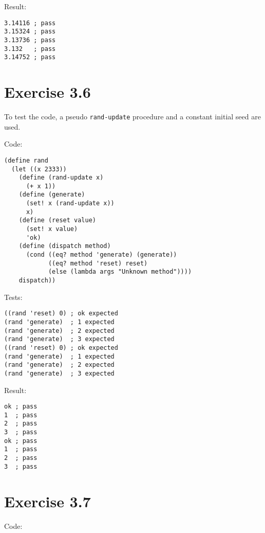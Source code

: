 \documentclass[../main.tex]{subfiles}
\begin{document}
Result:

\begin{lstlisting}
3.14116 ; pass
3.15324 ; pass
3.13736 ; pass
3.132   ; pass
3.14752 ; pass
\end{lstlisting}

\section{Exercise 3.6}

To test the code, a pseudo \lstinline{rand-update}
 procedure and a constant initial seed are used.

Code:

\begin{lstlisting}
(define rand
  (let ((x 2333))
    (define (rand-update x)
      (+ x 1))
    (define (generate)
      (set! x (rand-update x))
      x)
    (define (reset value)
      (set! x value)
      'ok)
    (define (dispatch method)
      (cond ((eq? method 'generate) (generate))
            ((eq? method 'reset) reset)
            (else (lambda args "Unknown method"))))
    dispatch))
\end{lstlisting}

Tests:

\begin{lstlisting}
((rand 'reset) 0) ; ok expected
(rand 'generate)  ; 1 expected
(rand 'generate)  ; 2 expected
(rand 'generate)  ; 3 expected
((rand 'reset) 0) ; ok expected
(rand 'generate)  ; 1 expected
(rand 'generate)  ; 2 expected
(rand 'generate)  ; 3 expected
\end{lstlisting}

Result:

\begin{lstlisting}
ok ; pass
1  ; pass
2  ; pass
3  ; pass
ok ; pass
1  ; pass
2  ; pass
3  ; pass
\end{lstlisting}

\section{Exercise 3.7}

Code:
\end{document}
